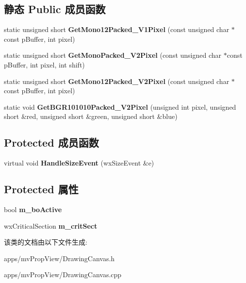 \subsection*{静态 Public 成员函数}
\begin{DoxyCompactItemize}
\item 
\hypertarget{class_drawing_canvas_a7153565fd6483fa98858aa0c2e841753}{static unsigned short {\bfseries Get\+Mono12\+Packed\+\_\+\+V1\+Pixel} (const unsigned char $\ast$const p\+Buffer, int pixel)}\label{class_drawing_canvas_a7153565fd6483fa98858aa0c2e841753}

\item 
\hypertarget{class_drawing_canvas_a1615b8f32f7a20e51e6cb1adbfbf5877}{static unsigned short {\bfseries Get\+Mono\+Packed\+\_\+\+V2\+Pixel} (const unsigned char $\ast$const p\+Buffer, int pixel, int shift)}\label{class_drawing_canvas_a1615b8f32f7a20e51e6cb1adbfbf5877}

\item 
\hypertarget{class_drawing_canvas_afb088653169a2af43c54c0dafb5fa288}{static unsigned short {\bfseries Get\+Mono12\+Packed\+\_\+\+V2\+Pixel} (const unsigned char $\ast$const p\+Buffer, int pixel)}\label{class_drawing_canvas_afb088653169a2af43c54c0dafb5fa288}

\item 
\hypertarget{class_drawing_canvas_a23881a32a4344c99287805a272e9ab22}{static void {\bfseries Get\+B\+G\+R101010\+Packed\+\_\+\+V2\+Pixel} (unsigned int pixel, unsigned short \&red, unsigned short \&green, unsigned short \&blue)}\label{class_drawing_canvas_a23881a32a4344c99287805a272e9ab22}

\end{DoxyCompactItemize}
\subsection*{Protected 成员函数}
\begin{DoxyCompactItemize}
\item 
\hypertarget{class_drawing_canvas_af3b9030a544090a116ff805270771820}{virtual void {\bfseries Handle\+Size\+Event} (wx\+Size\+Event \&e)}\label{class_drawing_canvas_af3b9030a544090a116ff805270771820}

\end{DoxyCompactItemize}
\subsection*{Protected 属性}
\begin{DoxyCompactItemize}
\item 
\hypertarget{class_drawing_canvas_a6be903bfad178b8e1777f297930119ae}{bool {\bfseries m\+\_\+bo\+Active}}\label{class_drawing_canvas_a6be903bfad178b8e1777f297930119ae}

\item 
\hypertarget{class_drawing_canvas_ad97d516b6f924da07d4b9ce5db0ecb62}{wx\+Critical\+Section {\bfseries m\+\_\+crit\+Sect}}\label{class_drawing_canvas_ad97d516b6f924da07d4b9ce5db0ecb62}

\end{DoxyCompactItemize}


该类的文档由以下文件生成\+:\begin{DoxyCompactItemize}
\item 
apps/mv\+Prop\+View/Drawing\+Canvas.\+h\item 
apps/mv\+Prop\+View/Drawing\+Canvas.\+cpp\end{DoxyCompactItemize}
